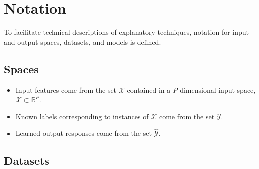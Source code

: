 \documentclass[11pt]{asaproc}
\begin{document}
\section{Notation} \label{sec:notation}

To facilitate technical descriptions of explanatory techniques, notation for input and output spaces, datasets, and models is defined.

\subsection{Spaces} 
 
	\begin{itemize}
		\item Input features come from the set $\mathcal{X}$ contained in a \textit{P}-dimensional input space,\\ $\mathcal{X} \subset \mathbb{R}^P$.  
		\item Known labels corresponding to instances of $\mathcal{X}$ come from the set $\mathcal{Y}$.
		\item Learned output responses come from the set $\mathcal{\hat{Y}}$. %
	\end{itemize}	
	
\subsection{Datasets} 
\end{document}
